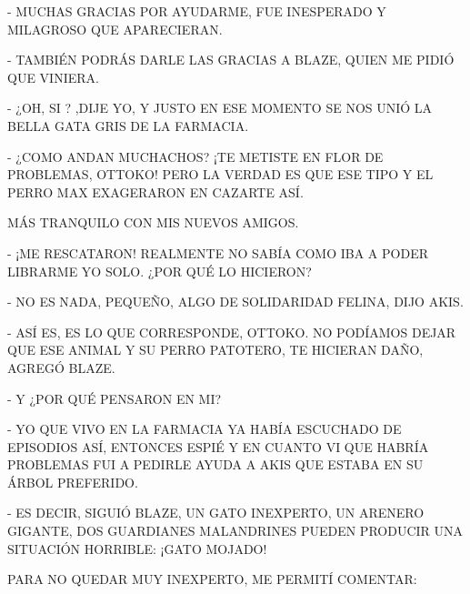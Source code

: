 - MUCHAS GRACIAS POR AYUDARME, FUE INESPERADO Y MILAGROSO QUE APARECIERAN.

- TAMBIÉN PODRÁS DARLE LAS GRACIAS A BLAZE, QUIEN ME PIDIÓ QUE VINIERA.

- ¿OH, SI ?	,DIJE YO, Y JUSTO EN ESE MOMENTO SE NOS UNIÓ LA BELLA GATA GRIS DE LA FARMACIA.

- ¿COMO ANDAN MUCHACHOS? ¡TE METISTE EN FLOR DE PROBLEMAS, OTTOKO! PERO LA VERDAD ES QUE ESE TIPO Y EL PERRO MAX EXAGERARON EN CAZARTE ASÍ.



\newpage
{}
MÁS TRANQUILO CON MIS NUEVOS AMIGOS.



\newpage
{}

- ¡ME RESCATARON! REALMENTE NO SABÍA COMO IBA A PODER LIBRARME YO SOLO. ¿POR QUÉ LO HICIERON?

- NO ES NADA, PEQUEÑO, ALGO DE SOLIDARIDAD FELINA, DIJO AKIS.

- ASÍ ES, ES LO QUE CORRESPONDE, OTTOKO. NO PODÍAMOS DEJAR QUE ESE ANIMAL Y SU PERRO PATOTERO, TE HICIERAN DAÑO, AGREGÓ BLAZE.

- Y ¿POR QUÉ PENSARON EN MI?

- YO QUE VIVO EN LA FARMACIA YA HABÍA ESCUCHADO DE EPISODIOS ASÍ, ENTONCES ESPIÉ Y EN CUANTO VI  QUE HABRÍA PROBLEMAS FUI A PEDIRLE AYUDA A AKIS QUE ESTABA EN SU ÁRBOL PREFERIDO.

- ES DECIR, SIGUIÓ BLAZE, UN GATO INEXPERTO, UN ARENERO GIGANTE,  DOS GUARDIANES MALANDRINES PUEDEN PRODUCIR UNA SITUACIÓN HORRIBLE: ¡GATO MOJADO!


\newpage
{}
PARA NO QUEDAR MUY INEXPERTO, ME PERMITÍ COMENTAR:

